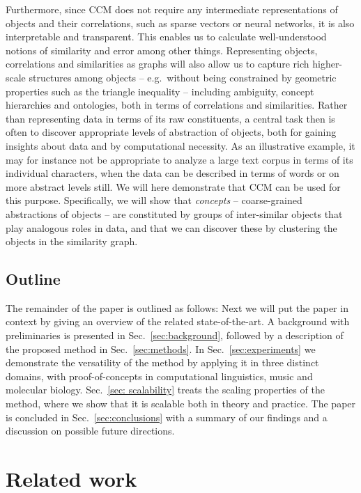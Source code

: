 \documentclass[conference]{IEEEtran}
\begin{document}
Furthermore, since CCM does not require any intermediate representations of objects and their correlations, such as sparse vectors
 or neural networks, it is also interpretable and transparent. This enables us to calculate well-understood notions
of similarity and error among other things. Representing objects, correlations and similarities as graphs will also allow us
 to capture rich higher-scale structures among objects -- e.g.\ without being constrained by geometric properties such as the triangle 
inequality -- including ambiguity, concept hierarchies and ontologies, both in terms of correlations and similarities.
Rather than representing data in terms of its raw constituents, a central task then is often to discover appropriate levels of abstraction 
of objects, both for gaining insights about data and by computational necessity. As an illustrative example, it may 
for instance not be appropriate to analyze a large text corpus in terms of its individual characters, when the data can be described in 
terms of words or on more abstract levels still. We will here demonstrate that CCM can be used for this purpose. Specifically, we will show 
that \emph{concepts} -- coarse-grained abstractions of objects -- are constituted by groups of inter-similar objects that play 
analogous roles in data, and that we can discover these by clustering the objects in the similarity graph. 

\subsection{Outline}
The remainder of the paper is outlined as follows: Next we will put the paper in context by giving an overview of the related
state-of-the-art. A background with preliminaries is presented in Sec.\ \ref{sec:background}, followed by a description of the
proposed method in Sec.\ \ref{sec:methods}. In Sec.\ \ref{sec:experiments} we demonstrate the versatility of the method by
applying it in three distinct domains, with proof-of-concepts in computational linguistics, music and molecular biology. Sec.\
\ref{sec: scalability} treats the scaling properties of the method, where we show that it is scalable both in theory and
practice. The paper is concluded in Sec.\ \ref{sec:conclusions} with a summary of our findings and a discussion on possible
future directions.

\section{Related work}
\label{sec:related work}
\end{document}

